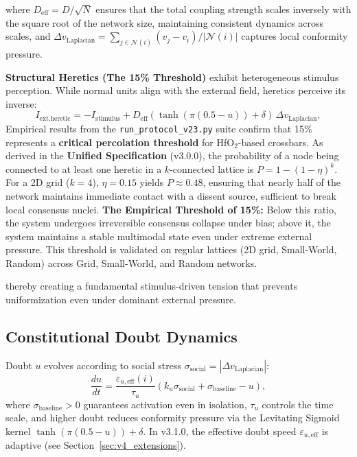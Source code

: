 \documentclass[11pt]{article}
\begin{document}
where $D_{\text{eff}} = D/\sqrt{N}$ ensures that the total coupling strength scales inversely with the square root of the network size, maintaining consistent dynamics across scales, and $\Delta v_{\text{Laplacian}} = \sum_{j \in \mathcal{N}(i)} (v_j - v_i)/|\mathcal{N}(i)|$ captures local conformity pressure.

\medskip
\noindent\textbf{Structural Heretics (The 15\% Threshold)} exhibit heterogeneous stimulus perception. While normal units align with the external field, heretics perceive its inverse:
\begin{equation}
I_{\text{ext,heretic}} = -I_{\text{stimulus}} + D_{\text{eff}} (\tanh(\pi(0.5-u)) + \delta)\,\Delta v_{\text{Laplacian}},
\end{equation}
Empirical results from the \texttt{run\_protocol\_v23.py} suite confirm that 15\% represents a \textbf{critical percolation threshold} for HfO$_2$-based crossbars. As derived in the \textbf{Unified Specification} (v3.0.0), the probability of a node being connected to at least one heretic in a $k$-connected lattice is $P = 1 - (1-\eta)^k$. For a 2D grid ($k=4$), $\eta=0.15$ yields $P \approx 0.48$, ensuring that nearly half of the network maintains immediate contact with a dissent source, sufficient to break local consensus nuclei.
\smallskip
\noindent\textbf{The Empirical Threshold of 15\%:} Below this ratio, the system undergoes irreversible consensus collapse under bias; above it, the system maintains a stable multimodal state even under extreme external pressure. This threshold is validated on regular lattices (2D grid, Small-World, Random) across Grid, Small-World, and Random networks.

thereby creating a fundamental stimulus-driven tension that prevents uniformization even under dominant external pressure.

\subsection{Constitutional Doubt Dynamics}

Doubt $u$ evolves according to social stress $\sigma_{\text{social}} = |\Delta v_{\text{Laplacian}}|$:
\begin{equation}
\frac{du}{dt} = \frac{\varepsilon_{u,\text{eff}}(i)}{\tau_u}(k_u \sigma_{\text{social}} + \sigma_{\text{baseline}} - u),
\end{equation}
where $\sigma_{\text{baseline}} > 0$ guarantees activation even in isolation, $\tau_u$ controls the time scale, and higher doubt reduces conformity pressure via the Levitating Sigmoid kernel $\tanh(\pi(0.5-u)) + \delta$. In v3.1.0, the effective doubt speed $\varepsilon_{u,\text{eff}}$ is adaptive (see Section~\ref{sec:v4_extensions}).
\end{document}
